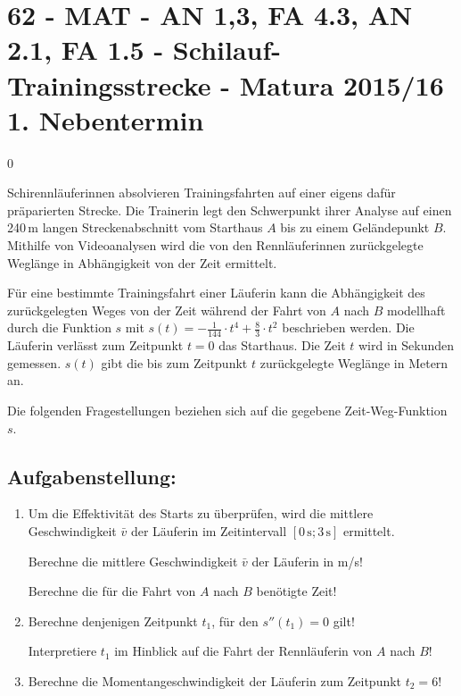 \section{62 - MAT - AN 1,3, FA 4.3, AN 2.1, FA 1.5 - Schilauf-Trainingsstrecke - Matura 2015/16 1. Nebentermin}

\begin{langesbeispiel} \item[0] %
	
Schirennläuferinnen absolvieren Trainingsfahrten auf einer eigens dafür präparierten Strecke. Die Trainerin legt den Schwerpunkt ihrer Analyse auf einen 240\,m langen Streckenabschnitt vom Starthaus $A$ bis zu einem Geländepunkt $B$. Mithilfe von Videoanalysen wird die von den Rennläuferinnen zurückgelegte Weglänge in Abhängigkeit von der Zeit ermittelt.

Für eine bestimmte Trainingsfahrt einer Läuferin kann die Abhängigkeit des zurückgelegten  Weges von der Zeit während der Fahrt von $A$ nach $B$ modellhaft durch die Funktion $s$ mit $s(t)=-\frac{1}{144}\cdot t^4+\frac{8}{3}\cdot t^2$ beschrieben werden. Die Läuferin verlässt zum Zeitpunkt $t=0$ das Starthaus. Die Zeit $t$ wird in Sekunden gemessen. $s(t)$ gibt die bis zum Zeitpunkt $t$ zurückgelegte Weglänge in Metern an.

Die folgenden Fragestellungen beziehen sich auf die gegebene Zeit-Weg-Funktion $s$.


\subsection{Aufgabenstellung:}
\begin{enumerate}
	\item Um die Effektivität des Starts zu überprüfen, wird die mittlere Geschwindigkeit $\bar{v}$ der Läuferin im Zeitintervall $[0\,\text{s};3\,\text{s}]$ ermittelt.
	
	Berechne die mittlere Geschwindigkeit $\bar{v}$ der Läuferin in m/s!
	
	Berechne die für die Fahrt von $A$ nach $B$ benötigte Zeit!
	
	\item {} Berechne denjenigen Zeitpunkt $t_1$, für den $s''(t_1)=0$ gilt!
			
			Interpretiere $t_1$ im Hinblick auf die Fahrt der Rennläuferin von $A$ nach $B$!
			
	\item Berechne die Momentangeschwindigkeit der Läuferin zum Zeitpunkt $t_2=6$!
	

\end{enumerate}
\end{langesbeispiel}
